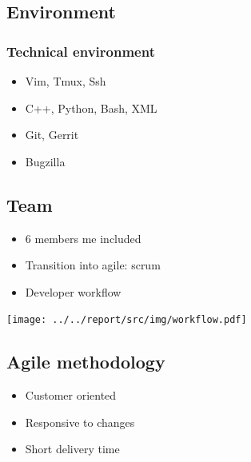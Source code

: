\subsection{Environment}
\begin{frame}
    \frametitle{Technical environment}
    \begin{itemize}
        \item Vim, Tmux, Ssh
        \item C++, Python, Bash, XML
        \item Git, Gerrit
        \item Bugzilla
    \end{itemize}
\end{frame}

\subsection{Team}
\begin{FrameWithSubSection}
    \begin{minipage}{0.49\textwidth}
        \begin{itemize}
            \item 6 members me included
            \item Transition into agile: scrum
            \item Developer workflow
        \end{itemize}
    \end{minipage}
    \begin{minipage}{0.49\textwidth}
        \flushright
        \texttt{[image: ../../report/src/img/workflow.pdf]}
    \end{minipage}
\end{FrameWithSubSection}

\subsection{Agile methodology}
\begin{FrameWithSubSection}
    \begin{itemize}
        \item Customer oriented
        \item Responsive to changes
        \item Short delivery time
    \end{itemize}
\end{FrameWithSubSection}

